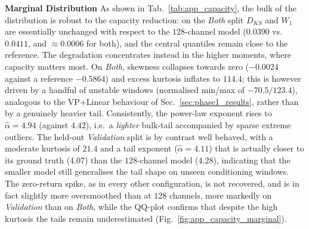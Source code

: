 \textbf{Marginal Distribution} \quad As shown in Tab.~\ref{tab:app_capacity}, the bulk of the distribution is robust to the capacity reduction: on the \emph{Both} split \(D_{KS}\) and \(W_1\) are essentially unchanged with respect to the \(128\)-channel model (\(0.0390\) vs.\ \(0.0411\), and \(\approx0.0006\) for both), and the central quantiles remain close to the reference. The degradation concentrates instead in the higher moments, where capacity matters most. On \emph{Both}, skewness collapses towards zero (\(-0.0024\) against a reference \(-0.5864\)) and excess kurtosis inflates to \(114.4\); this is however driven by a handful of unstable windows (normalised min/max of \(-70.5/123.4\)), analogous to the VP+Linear behaviour of Sec.~\ref{sec:phase1_results}, rather than by a genuinely heavier tail. Consistently, the power-law exponent rises to \(\hat{\alpha}=4.94\) (against \(4.42\)), i.e.\ a \emph{lighter} bulk-tail accompanied by sparse extreme outliers. The held-out \emph{Validation} split is by contrast well behaved, with a moderate kurtosis of \(21.4\) and a tail exponent (\(\hat{\alpha}=4.11\)) that is actually closer to its ground truth (\(4.07\)) than the \(128\)-channel model (\(4.28\)), indicating that the smaller model still generalises the tail shape on unseen conditioning windows. The zero-return spike, as in every other configuration, is not recovered, and is in fact slightly more oversmoothed than at \(128\) channels, more markedly on \emph{Validation} than on \emph{Both}, while the QQ-plot confirms that despite the high kurtosis the tails remain underestimated (Fig.~\ref{fig:app_capacity_marginal}).

